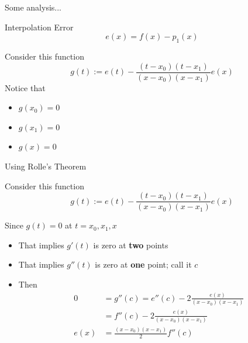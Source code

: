 \documentclass[10pt]{beamer}
\begin{document}
\begin{frame}{Some analysis...}
\begin{block}{Interpolation Error}
    $$
    e(x) = f(x) - p_1(x)
    $$
\end{block}

\begin{block}{Consider this function}
    \begin{equation*}
  g(t) := e(t) - \frac{(t-x_0)(t-x_1)}{(x-x_0)(x-x_1)}e(x)
\end{equation*}
Notice that
\begin{itemize}
    \item $g(x_0)=0$
    \item $g(x_1)=0$
    \item $g(x)=0$
\end{itemize}
\end{block}

\end{frame}
\begin{frame}{Using Rolle's Theorem}

\begin{block}{Consider this function}
    \begin{equation*}
  g(t) := e(t) - \frac{(t-x_0)(t-x_1)}{(x-x_0)(x-x_1)}e(x)
\end{equation*}
\end{block}


Since $g(t)=0$ at $t=x_0, x_1, x$
\begin{itemize}
  \item That implies $g'(t)$ is zero at \textbf{two} points 
  \item That implies $g''(t)$ is zero at \textbf{one} point; call it $c$
  \item Then
\begin{align*}
  0 & = g''(c) = e''(c) - 2 \frac{e(x)}{(x-x_0)(x-x_1)}\\
    & = f''(c) - 2 \frac{e(x)}{(x-x_0)(x-x_1)}\\
  e(x) &= \frac{(x-x_0)(x-x_1)}{2} f''(c)
\end{align*}
\end{itemize}
\end{frame}
\end{document}
